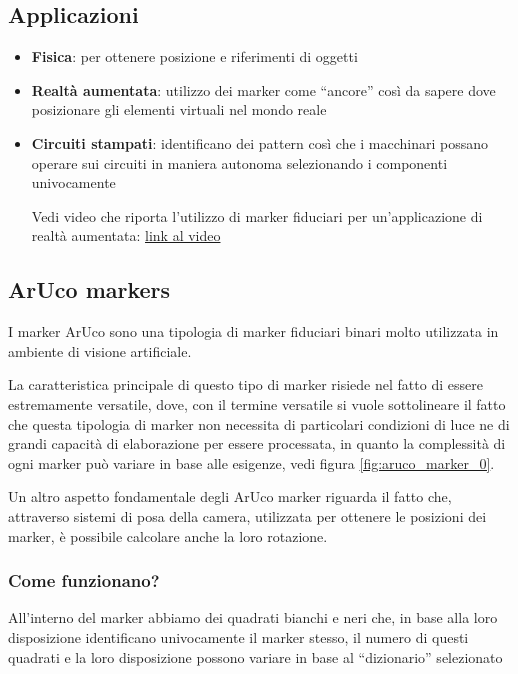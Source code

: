 \documentclass[12pt,a4paper,openright,twoside]{book}
\begin{document}
\subsection{Applicazioni}
\begin{itemize}
	\item \textbf{Fisica}: per ottenere posizione e riferimenti di oggetti
	\item \textbf{Realtà aumentata}: utilizzo dei marker come ``ancore'' così da sapere dove posizionare gli elementi virtuali nel mondo reale
	\item \textbf{Circuiti stampati}: identificano dei pattern così che i macchinari possano operare sui circuiti in maniera autonoma selezionando i componenti univocamente
	
	
	Vedi video che riporta l'utilizzo di marker fiduciari per un'applicazione di realtà aumentata:
	\href{https://youtu.be/nsu9tNIJ6F0?si=MB4zTZP5yiCO9aW7}{link al video}
\end{itemize}

\subsection{ArUco markers} \label{subsec:aruco_markers}
I marker ArUco sono una tipologia di marker fiduciari binari molto utilizzata in ambiente di visione artificiale.

La caratteristica principale di questo tipo di marker risiede nel fatto di essere estremamente versatile, dove,
con il termine versatile si vuole sottolineare il fatto che questa tipologia di marker non necessita di particolari condizioni di luce ne di grandi capacità di elaborazione per essere processata, in quanto la complessità di ogni marker può variare in base alle esigenze, vedi figura \ref{fig:aruco_marker_0}.

Un altro aspetto fondamentale degli ArUco marker riguarda il fatto che, attraverso sistemi di posa della camera, utilizzata per ottenere le posizioni dei marker, è possibile calcolare anche la loro rotazione.

\subsubsection{Come funzionano?}
All'interno del marker abbiamo dei quadrati bianchi e neri che, in base alla loro disposizione identificano univocamente il marker stesso, il numero di questi quadrati e la loro disposizione possono variare in base al ``dizionario'' selezionato
\end{document}
